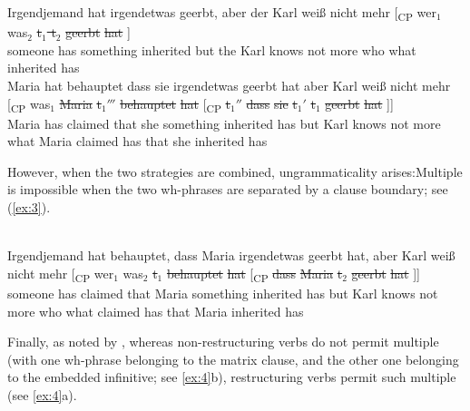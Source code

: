 \documentclass[output=paper]{langsci/langscibook}
\begin{document}
\ea\label{dg534} 
    \ea \gll Irgendjemand \label{dg534a}hat irgendetwas geerbt, aber der Karl
    wei{\ss} nicht mehr [\textsubscript{CP} wer$_1$ was$_2$ \sout{t$_1$ t$_2$} \sout{geerbt} \sout{hat} ]\\
        someone has something inherited but the Karl knows not more {} who what {} inherited has \\
    \ex  \gll Maria hat behauptet dass sie irgendetwas geerbt hat aber Karl wei{\ss} nicht mehr [\textsubscript{CP} was$_1$ \sout{Maria} \sout{t$_1'''$} \sout{behauptet} \sout{hat} [\textsubscript{CP} \sout{t$_1''$} \sout{dass} \sout{sie} \sout{t$_1'$} \sout{t$_1$} \sout{geerbt} \sout{hat} ]]\\
        Maria has claimed that she something inherited has but Karl knows not more {} what Maria {} claimed has \hspace{0mm} \hspace{0mm} that she {} \hspace{0mm} inherited has \\
    \z
\z

However, when the two strategies are combined, ungrammaticality
arises:\linebreak Multiple  is impossible when the two wh-phrases are
separated by a clause boundary; see (\ref{ex:3}).\newpage

\ea {}\\
    \gll \llap{*}Irgendjemand \label{unlod28}hat behauptet, dass Maria irgendetwas geerbt
hat, aber Karl wei{\ss} nicht mehr [\textsubscript{CP} wer$_1$ was$_2$
 \sout{t$_1$} \sout{behauptet} \sout{hat} [\textsubscript{CP}
\sout{dass} \sout{Maria} \sout{t$_2$} \sout{geerbt}
\sout{hat} ]] \\
someone has claimed that Maria something inherited has but
Karl knows not more {} who what \hspace{0mm} claimed has
\hspace{0mm} that Maria \hspace{0mm} inherited has \\\label{ex:3}
\z

Finally, as noted by \cite{Sauerland:99:loc}, whereas non-restructuring verbs
do not permit multiple  (with one wh-phrase belonging to the matrix
clause, and the other one belonging to the embedded infinitive; see
\ref{ex:4}b), restructuring verbs permit such multiple  (see
\ref{ex:4}a).
\end{document}
